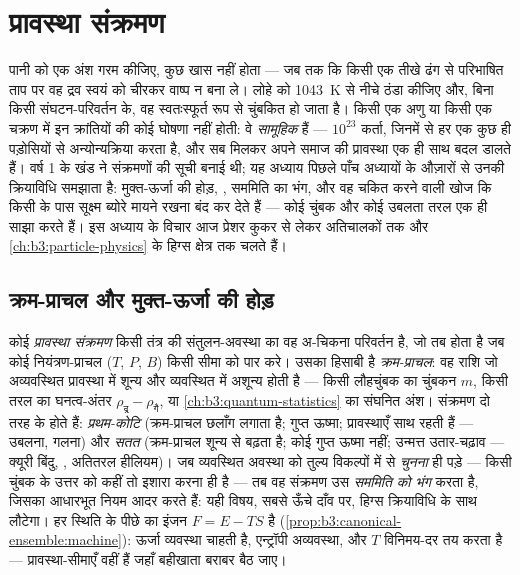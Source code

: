 \chapter{प्रावस्था संक्रमण}\label{ch:b3:phase-transitions}

पानी को एक अंश गरम कीजिए, कुछ खास नहीं होता --- जब तक कि किसी एक
तीखे ढंग से परिभाषित ताप पर वह द्रव स्वयं को चीरकर वाष्प न बना ले।
लोहे को \qty{1043}{K} से नीचे ठंडा कीजिए और, बिना किसी संघटन-परिवर्तन
के, वह स्वतःस्फूर्त रूप से चुंबकित हो जाता है। किसी एक अणु या किसी एक
चक्रण में इन क्रांतियों की कोई घोषणा नहीं होती: वे \emph{सामूहिक} हैं
--- $10^{23}$ कर्ता, जिनमें से हर एक कुछ ही पड़ोसियों से
अन्योन्यक्रिया करता है, और सब मिलकर अपने समाज की प्रावस्था एक ही साथ
बदल डालते हैं। वर्ष 1 के खंड ने संक्रमणों की सूची बनाई थी; यह अध्याय
पिछले पाँच अध्यायों के औज़ारों से उनकी क्रियाविधि समझाता है:
मुक्त-ऊर्जा की होड़, , सममिति का भंग, और वह चकित करने
वाली खोज कि किसी  के पास सूक्ष्म ब्योरे मायने रखना बंद
कर देते हैं --- कोई चुंबक और कोई उबलता तरल एक ही 
साझा करते हैं। इस अध्याय के विचार आज प्रेशर कुकर से लेकर अतिचालकों
तक और \cref{ch:b3:particle-physics} के हिग्स क्षेत्र तक चलते हैं।

\section{क्रम-प्राचल और मुक्त-ऊर्जा की होड़}

\begin{definition}[प्रावस्थाएँ और क्रम-प्राचल]\label{def:b3:phase-transitions:order}
कोई \emph{प्रावस्था संक्रमण} किसी तंत्र की संतुलन-अवस्था का वह
अ-चिकना परिवर्तन है, जो तब होता है जब कोई नियंत्रण-प्राचल ($T$, $P$,
$B$) किसी सीमा को पार करे। उसका हिसाबी है \emph{क्रम-प्राचल}: वह राशि
जो अव्यवस्थित प्रावस्था में शून्य और व्यवस्थित में अशून्य होती है ---
किसी लौहचुंबक का चुंबकन $m$, किसी तरल का घनत्व-अंतर
$\rho_{\text{द्र}} - \rho_{\text{गै}}$, या
\cref{ch:b3:quantum-statistics} का संघनित अंश। संक्रमण दो तरह के
होते हैं: \emph{प्रथम-कोटि} (क्रम-प्राचल छलाँग लगाता है; गुप्त ऊष्मा;
प्रावस्थाएँ साथ रहती हैं --- उबलना, गलना) और \emph{सतत} (क्रम-प्राचल
शून्य से बढ़ता है; कोई गुप्त ऊष्मा नहीं; उन्मत्त उतार-चढ़ाव ---
क्यूरी बिंदु, , अतितरल हीलियम)। जब व्यवस्थित अवस्था को
तुल्य विकल्पों में से \emph{चुनना} ही पड़े --- किसी चुंबक के उत्तर को
कहीं तो इशारा करना ही है --- तब वह संक्रमण उस \emph{सममिति को भंग}
करता है, जिसका आधारभूत नियम आदर करते हैं: यही विषय, सबसे ऊँचे दाँव
पर, हिग्स क्रियाविधि के साथ लौटेगा।
हर स्थिति के पीछे का इंजन  $F = E - TS$ है
(\cref{prop:b3:canonical-ensemble:machine}): ऊर्जा व्यवस्था चाहती है,
एन्ट्रॉपी अव्यवस्था, और $T$ विनिमय-दर तय करता है --- प्रावस्था-सीमाएँ
वहीं हैं जहाँ बहीखाता बराबर बैठ जाए।
\end{definition}

